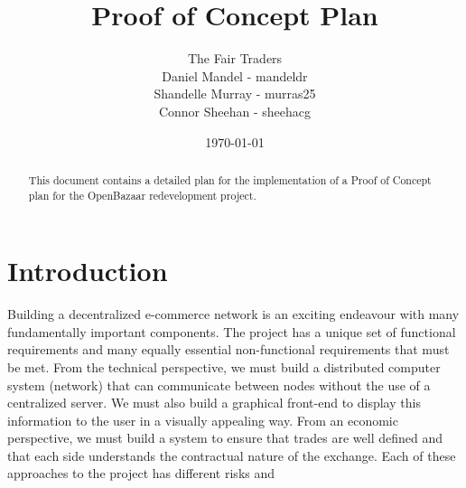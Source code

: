 \documentclass{article}
\begin{document}
\title{Proof of Concept Plan}
\author{The Fair Traders \\ Daniel Mandel - mandeldr \\ Shandelle Murray - murras25 \\ Connor Sheehan - sheehacg}
\date{\today}
\maketitle

\begin{abstract}
This document contains a detailed plan for the implementation of a Proof of Concept plan for the OpenBazaar redevelopment project.
\end{abstract}

\section{Introduction}
Building a decentralized e-commerce network is an exciting endeavour with many fundamentally important components. The project has a unique set of functional requirements and many equally essential non-functional requirements that must be met. From the technical perspective, we must build a distributed computer system (network) that can communicate between nodes without the use of a centralized server. We must also build a graphical front-end to display this information to the user in a visually appealing way. From an economic perspective, we must build a system to ensure that trades are well defined and that each side understands the contractual nature of the exchange. Each of these approaches to the project has different risks and 
\end{document}
